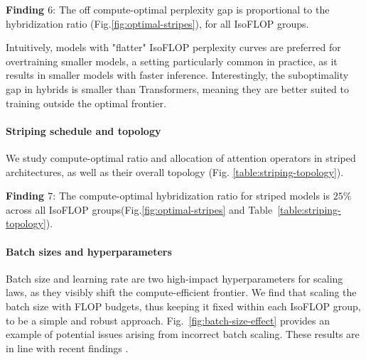 \begin{tcolorbox}[enhanced, frame hidden, sharp corners, colback=blue!5, boxsep=2pt, before skip=1pt, after skip=1pt]
   \textbf{Finding $6$}: The off compute-optimal perplexity gap is proportional to the hybridization ratio (Fig.\ref{fig:optimal-stripes}), for all IsoFLOP groups.
\end{tcolorbox}

Intuitively, models with "flatter" IsoFLOP perplexity curves are preferred for overtraining smaller models, a setting particularly common in practice, as it results in smaller models with faster inference. Interestingly, the suboptimality gap in hybrids is smaller than Transformers, meaning they are better suited to training outside the optimal frontier.

\paragraph{Striping schedule and topology}

We study compute-optimal ratio and allocation of attention operators in striped architectures, as well as their overall topology (Fig. \ref{table:striping-topology}).

\begin{tcolorbox}[enhanced, frame hidden, sharp corners, colback=blue!5, boxsep=2pt, before skip=1pt, after skip=1pt]
   \textbf{Finding $7$}: The compute-optimal hybridization ratio for striped models is $25\%$ across all IsoFLOP groups\footnotemark (Fig.\ref{fig:optimal-stripes} and Table~\ref{table:striping-topology}).
\end{tcolorbox}


\paragraph{Batch sizes and hyperparameters}

Batch size and learning rate are two high-impact hyperparameters for scaling laws, as they visibly shift the compute-efficient frontier. We find that scaling the batch size with FLOP budgets, thus keeping it fixed within each IsoFLOP group, to be a simple and robust approach. Fig.~\ref{fig:batch-size-effect} provides an example of potential issues arising from incorrect batch scaling. These results are in line with recent findings \cite{bi2024deepseek}.  

